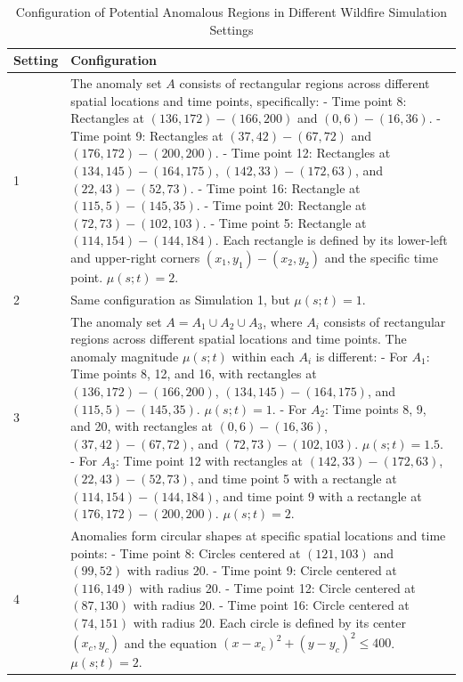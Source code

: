 \documentclass[11pt]{article}
\begin{document}
\begin{table}[ht]
    \centering
    \begin{tabularx}{\textwidth}{|l|X|}
        \hline
        \textbf{Setting} & \textbf{Configuration} \\
        \hline
        1 & The anomaly set \(A\) consists of rectangular regions across different spatial locations and time points, specifically: 
        - Time point 8: Rectangles at \((136,172)-(166,200)\) and \((0,6)-(16,36)\).
        - Time point 9: Rectangles at \((37,42)-(67,72)\) and \((176,172)-(200,200)\).
        - Time point 12: Rectangles at \((134,145)-(164,175)\), \((142,33)-(172,63)\), and \((22,43)-(52,73)\).
        - Time point 16: Rectangle at \((115,5)-(145,35)\).
        - Time point 20: Rectangle at \((72,73)-(102,103)\).
        - Time point 5: Rectangle at \((114,154)-(144,184)\).
        Each rectangle is defined by its lower-left and upper-right corners \((x_1,y_1)-(x_2,y_2)\) and the specific time point.
        \(\mu(s;t)=2\). \\
        \hline
        2 & Same configuration as Simulation 1, but \(\mu(s;t)=1\). \\
        \hline
        3 & The anomaly set \(A = A_1 \cup A_2 \cup A_3\), where \(A_i\) consists of rectangular regions across different spatial locations and time points. The anomaly magnitude \(\mu(s;t)\) within each \(A_i\) is different:
        - For \(A_1\): Time points 8, 12, and 16, with rectangles at \((136,172)-(166,200)\), \((134,145)-(164,175)\), and \((115,5)-(145,35)\). \(\mu(s;t)=1\).
        - For \(A_2\): Time points 8, 9, and 20, with rectangles at \((0,6)-(16,36)\), \((37,42)-(67,72)\), and \((72,73)-(102,103)\). \(\mu(s;t)=1.5\).
        - For \(A_3\): Time point 12 with rectangles at \((142,33)-(172,63)\), \((22,43)-(52,73)\), and time point 5 with a rectangle at \((114,154)-(144,184)\), and time point 9 with a rectangle at \((176,172)-(200,200)\). \(\mu(s;t)=2\). \\
        \hline
        4 & Anomalies form circular shapes at specific spatial locations and time points:
        - Time point 8: Circles centered at \((121,103)\) and \((99,52)\) with radius 20.
        - Time point 9: Circle centered at \((116,149)\) with radius 20.
        - Time point 12: Circle centered at \((87,130)\) with radius 20.
        - Time point 16: Circle centered at \((74,151)\) with radius 20.
        Each circle is defined by its center \((x_c,y_c)\) and the equation \((x-x_c)^2+(y-y_c)^2 \leq 400\). \(\mu(s;t)=2\). \\
        \hline
    \end{tabularx}
    \caption{Configuration of Potential Anomalous Regions in Different Wildfire Simulation Settings}
    \label{tab: configuration of anomaly}
\end{table}
\end{document}
